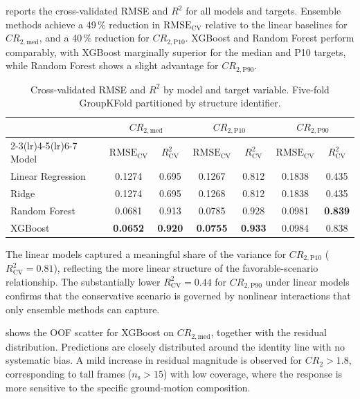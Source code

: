 \documentclass[preprint,12pt,authoryear]{elsarticle}
\newcommand{\CR}[1]{CR_{2,\text{#1}}}          %
\newcommand{\RMSE}{\mathrm{RMSE_{CV}}}
\newcommand{\Rsq}{R^{2}_{\mathrm{CV}}}
\newcommand{\np}{n_{\mathrm{s}}}               %
\begin{document}
 reports the cross-validated RMSE and $R^2$ for all
models and targets. Ensemble methods achieve a 49\,\% reduction in $\RMSE$
relative to the linear baselines for $\CR{med}$, and a 40\,\% reduction for
$\CR{P10}$. XGBoost and Random Forest perform comparably, with XGBoost
marginally superior for the median and P10 targets, while Random Forest shows
a slight advantage for $\CR{P90}$.

\begin{table}[h!]
\centering
\caption{Cross-validated RMSE and $R^2$ by model and target variable.
         Five-fold GroupKFold partitioned by structure identifier.}
\label{tab:performance}
\setlength{\tabcolsep}{6pt}
\begin{tabular}{lcccccc}
\toprule
& \multicolumn{2}{c}{$\CR{med}$}
& \multicolumn{2}{c}{$\CR{P10}$}
& \multicolumn{2}{c}{$\CR{P90}$} \\
\cmidrule(lr){2-3}\cmidrule(lr){4-5}\cmidrule(lr){6-7}
Model & $\RMSE$ & $\Rsq$ & $\RMSE$ & $\Rsq$ & $\RMSE$ & $\Rsq$ \\
\midrule
Linear Regression & 0.1274 & 0.695 & 0.1267 & 0.812 & 0.1838 & 0.435 \\
Ridge             & 0.1274 & 0.695 & 0.1268 & 0.812 & 0.1838 & 0.435 \\
Random Forest     & 0.0681 & 0.913 & 0.0785 & 0.928 & 0.0981 & \textbf{0.839} \\
XGBoost           & \textbf{0.0652} & \textbf{0.920} & \textbf{0.0755} & \textbf{0.933} & 0.0984 & 0.838 \\
\bottomrule
\end{tabular}
\end{table}

The linear models captured a meaningful share of the variance for $\CR{P10}$
($\Rsq = 0.81$), reflecting the more linear structure of the favorable-scenario
relationship. The substantially lower $\Rsq = 0.44$ for $\CR{P90}$ under
linear models confirms that the conservative scenario is governed by nonlinear
interactions that only ensemble methods can capture.

 shows the OOF scatter for XGBoost on $\CR{med}$,
together with the residual distribution. Predictions are closely distributed
around the identity line with no systematic bias. A mild increase in residual
magnitude is observed for $CR_2 > 1.8$, corresponding to tall frames
($\np > 15$) with low coverage, where the response is more sensitive to the
specific ground-motion composition.
\end{document}
